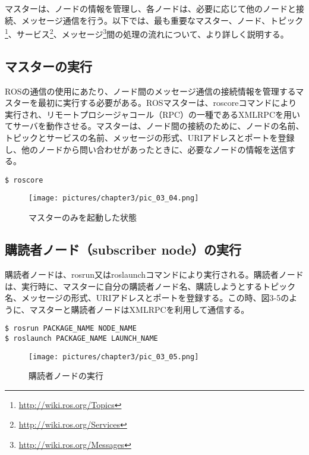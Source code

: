 マスターは、ノードの情報を管理し、各ノードは、必要に応じて他のノードと接続、メッセージ通信を行う。以下では、最も重要なマスター、ノード、トピック\footnote{\url{http://wiki.ros.org/Topics}}、サービス\footnote{\url{http://wiki.ros.org/Services}}、メッセージ\footnote{\url{http://wiki.ros.org/Messages}}間の処理の流れについて、より詳しく説明する。

\subsection{マスターの実行}

ROSの通信の使用にあたり、ノード間のメッセージ通信の接続情報を管理するマスターを最初に実行する必要がある。ROSマスターは、roscoreコマンドにより実行され、リモートプロシージャコール（RPC）の一種であるXMLRPCを用いてサーバを動作させる。マスターは、ノード間の接続のために、ノードの名前、トピックとサービスの名前、メッセージの形式、URIアドレスとポートを登録し、他のノードから問い合わせがあったときに、必要なノードの情報を送信する。

\begin{lstlisting}[language=ROS]
$ roscore
\end{lstlisting}

\begin{figure}[h]
  \centering
  \texttt{[image: pictures/chapter3/pic\_03\_04.png]}
  \caption{マスターのみを起動した状態}
\end{figure}

\subsection{購読者ノード（subscriber node）の実行}

購読者ノードは、rosrun又はroslaunchコマンドにより実行される。購読者ノードは、実行時に、マスターに自分の購読者ノード名、購読しようとするトピック名、メッセージの形式、URIアドレスとポートを登録する。この時、図3-5のように、マスターと購読者ノードはXMLRPCを利用して通信する。

\begin{lstlisting}[language=ROS]
$ rosrun PACKAGE_NAME NODE_NAME
$ roslaunch PACKAGE_NAME LAUNCH_NAME
\end{lstlisting}

\begin{figure}[h]
  \centering
  \texttt{[image: pictures/chapter3/pic\_03\_05.png]}
  \caption{購読者ノードの実行}
\end{figure}

